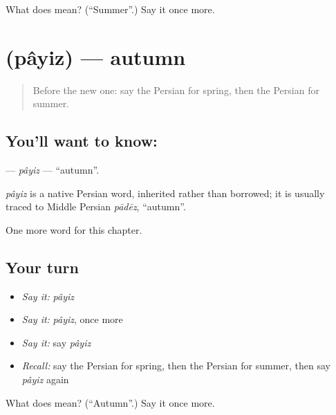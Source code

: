 \begin{tcolorbox}[breakable,colback=teal!4,colframe=teal!35!black,title={Before you move on}]
What does  mean? (\textquotedblleft{}Summer\textquotedblright{}.) Say it once more.
\end{tcolorbox}
\section[\texorpdfstring{\fa{پاییز} (pâyiz)}{پاییز (pâyiz)}]{ (pâyiz) — autumn}

\label{lesson:FA-C80-payiz}



\begin{quote}
Before the new one: say the Persian for spring, then the Persian for summer.
\end{quote}

\subsection*{You'll want to know: }
\textbf{} — \emph{pâyiz} — \textquotedblleft{}autumn\textquotedblright{}.

\begin{cousinweb}
\emph{pâyiz} is a native Persian word, inherited rather than borrowed; it is usually traced to Middle Persian \emph{pādēz}, \textquotedblleft{}autumn\textquotedblright{}.
\end{cousinweb}

\begin{grammarlens}[title={What you've built}]
One more word for this chapter.
\end{grammarlens}

\subsection*{Your turn}
\begin{itemize}
\raggedright
  \item \emph{Say it:} \emph{pâyiz}
  \item \emph{Say it:} \emph{pâyiz}, once more
  \item \emph{Say it:} say \emph{pâyiz}
  \item \emph{Recall:} say the Persian for spring, then the Persian for summer, then say \emph{pâyiz} again
\end{itemize}

\begin{tcolorbox}[breakable,colback=teal!4,colframe=teal!35!black,title={Before you move on}]
What does  mean? (\textquotedblleft{}Autumn\textquotedblright{}.) Say it once more.
\end{tcolorbox}
